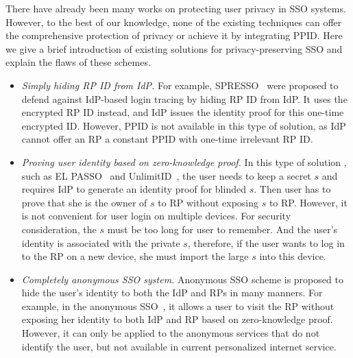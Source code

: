 There have already been many works on protecting user privacy in SSO systems. 
However, to the best of our knowledge, none of the existing techniques can offer the comprehensive protection of privacy or achieve it by integrating PPID. 
Here we give a brief introduction of existing solutions for privacy-preserving SSO and explain the flaws of these schemes. 
\begin{itemize}
\item {\em Simply hiding RP ID from IdP. }For example, SPRESSO~\cite{SPRESSO} were proposed to defend against IdP-based login tracing by hiding RP ID from IdP. It uses the encrypted RP ID instead, and IdP issues the identity proof for this one-time encrypted ID. However, PPID is not available in this type of solution, as IdP cannot offer an RP a constant PPID with one-time irrelevant RP ID.
\item {\em Proving user identity based on zero-knowledge proof. }In this type of solution , such as EL PASSO~\cite{ZhangKSZR21} and UnlimitID~\cite{IsaakidisHD16}, the user needs to keep a secret $s$ and requires IdP to generate an identity proof for blinded $s$. Then user has to prove that she is the owner of $s$ to RP without exposing $s$ to RP. However, it is not convenient for user login on multiple devices. For security consideration, the $s$ must be too long for user to remember.  And the user's identity is associated with the private $s$, therefore, if the user wants to log in to the RP on a new device, she must import the large $s$ into this device. 
\item {\em Completely anonymous SSO system. }Anonymous SSO scheme is proposed to hide the user's identity to both the IdP and RPs in many manners. For example, in the anonymous SSO~\cite{HanCSTW18}, it allows a user to visit the RP without exposing her identity to both IdP and RP based on zero-knowledge proof. However, it can only be applied to the anonymous services that do not identify the user, but not available in current personalized internet service.
\end{itemize}



